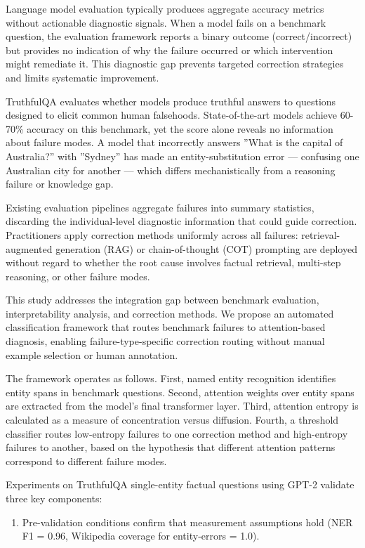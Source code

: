 
Language model evaluation typically produces aggregate accuracy metrics without actionable diagnostic signals. When a model fails on a benchmark question, the evaluation framework reports a binary outcome (correct/incorrect) but provides no indication of why the failure occurred or which intervention might remediate it. This diagnostic gap prevents targeted correction strategies and limits systematic improvement.

TruthfulQA \citep{Lin2021TruthfulQA} evaluates whether models produce truthful answers to questions designed to elicit common human falsehoods. State-of-the-art models achieve 60-70\% accuracy on this benchmark, yet the score alone reveals no information about failure modes. A model that incorrectly answers ''What is the capital of Australia?'' with ''Sydney'' has made an entity-substitution error --- confusing one Australian city for another --- which differs mechanistically from a reasoning failure or knowledge gap.

Existing evaluation pipelines aggregate failures into summary statistics, discarding the individual-level diagnostic information that could guide correction. Practitioners apply correction methods uniformly across all failures: retrieval-augmented generation (RAG) or chain-of-thought (COT) prompting are deployed without regard to whether the root cause involves factual retrieval, multi-step reasoning, or other failure modes.

This study addresses the integration gap between benchmark evaluation, interpretability analysis, and correction methods. We propose an automated classification framework that routes benchmark failures to attention-based diagnosis, enabling failure-type-specific correction routing without manual example selection or human annotation.

The framework operates as follows. First, named entity recognition identifies entity spans in benchmark questions. Second, attention weights over entity spans are extracted from the model's final transformer layer. Third, attention entropy is calculated as a measure of concentration versus diffusion. Fourth, a threshold classifier routes low-entropy failures to one correction method and high-entropy failures to another, based on the hypothesis that different attention patterns correspond to different failure modes.

Experiments on TruthfulQA single-entity factual questions using GPT-2 validate three key components:

\begin{enumerate}
\item Pre-validation conditions confirm that measurement assumptions hold (NER F1 = 0.96, Wikipedia coverage for entity-errors = 1.0).
\end{enumerate}

